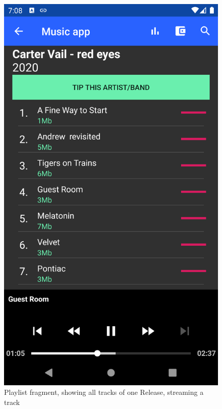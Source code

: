 \begin{figure}[]
        \includegraphics[width=1\linewidth]{implementation/playing-track.png}
        \caption{Playlist fragment, showing all tracks of one Release, streaming a track}
        \label{fig:screenshot-playlist}
    \endminipage\hfill

\end{figure}
